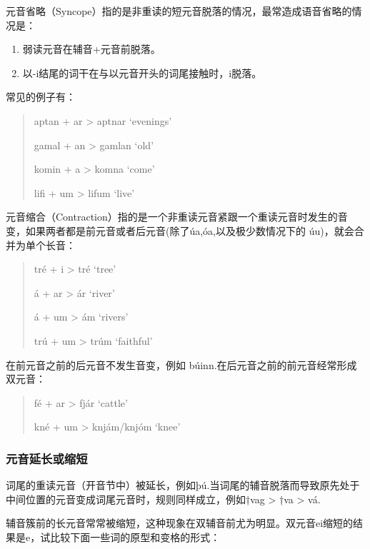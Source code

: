     元音省略（Syncope）指的是非重读的短元音脱落的情况，最常造成语音省略的情况是：

    \begin{info}
        \begin{enumerate}
            \item 弱读元音在辅音+元音前脱落。
            \item 以-i结尾的词干在与以元音开头的词尾接触时，i脱落。
        \end{enumerate}
    \end{info}

    常见的例子有：

\begin{quote}
  aptan + ar \textgreater{} aptnar `evenings'

  gamal + an \textgreater{} gamlan `old'

  komin + a \textgreater{} komna `come'

  lifi + um \textgreater{} lifum `live'
\end{quote}

元音缩合（Contraction）指的是一个非重读元音紧跟一个重读元音时发生的音变，如果两者都是前元音或者后元音(除了úa,óa,以及极少数情况下的 úu)，就会合并为单个长音：

\begin{quote}
    tré + i \textgreater{} tré `tree'
  
    á + ar \textgreater{} ár `river'
  
    á + um \textgreater{} ám `rivers'
  
    trú + um \textgreater{} trúm `faithful'
\end{quote}

  在前元音之前的后元音不发生音变，例如 búinn.在后元音之前的前元音经常形成双元音：

\begin{quote}
  fé + ar \textgreater{} fjár `cattle'

  kné + um \textgreater{} knjám/knjóm `knee'
\end{quote}

\subsubsection{元音延长或缩短}
\label{元音延长或缩短}
    
    词尾的重读元音（开音节中）被延长，例如þú.当词尾的辅音脱落而导致原先处于中间位置的元音变成词尾元音时，规则同样成立，例如†vag \textgreater{} †va \textgreater{} vá.

    辅音簇前的长元音常常被缩短，这种现象在双辅音前尤为明显。双元音ei缩短的结果是e，试比较下面一些词的原型和变格的形式：

